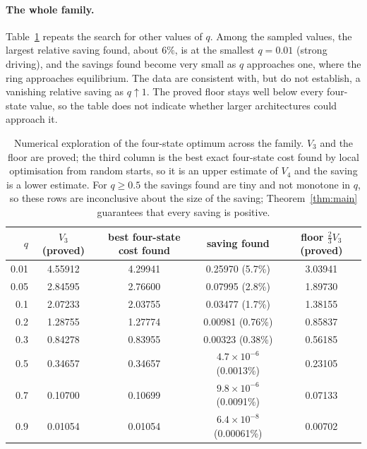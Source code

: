 \documentclass[11pt,a4paper]{article}
\theoremstyle{remark}\newtheorem{remark}[theorem]{Remark}
\begin{document}
\paragraph{The whole family.}
Table~\ref{tab:grid} repeats the search for other values of $q$.
Among the sampled values, the largest relative saving found, about $6\%$, is
at the smallest $q=0.01$ (strong driving), and the savings found become very
small as $q$ approaches one, where the ring approaches equilibrium. The data
are consistent with, but do not establish, a vanishing relative saving as
$q\uparrow1$. The proved floor stays well below every four-state value, so the
table does not indicate whether larger architectures could approach it.
\begin{table}[tb]\centering\small
\caption{Numerical exploration of the four-state optimum across the family. $V_3$ and the floor are proved; the third column is the best exact four-state cost found by local optimisation from random starts, so it is an upper estimate of $V_4$ and the saving is a lower estimate. For $q\geq0.5$ the savings found are tiny and not monotone in $q$, so these rows are inconclusive about the size of the saving; Theorem~\ref{thm:main} guarantees that every saving is positive.}
\label{tab:grid}
\begin{tabular}{@{}rcccc@{}}\toprule
$q$ & $V_3$ (proved) & best four-state cost found & saving found & floor $\tfrac23V_3$ (proved)\\\midrule
0.01 & 4.55912 & 4.29941 & 0.25970 (5.7\%) & 3.03941\\
0.05 & 2.84595 & 2.76600 & 0.07995 (2.8\%) & 1.89730\\
0.1 & 2.07233 & 2.03755 & 0.03477 (1.7\%) & 1.38155\\
0.2 & 1.28755 & 1.27774 & 0.00981 (0.76\%) & 0.85837\\
0.3 & 0.84278 & 0.83955 & 0.00323 (0.38\%) & 0.56185\\
0.5 & 0.34657 & 0.34657 & $4.7\times10^{-6}$ (0.0013\%) & 0.23105\\
0.7 & 0.10700 & 0.10699 & $9.8\times10^{-6}$ (0.0091\%) & 0.07133\\
0.9 & 0.01054 & 0.01054 & $6.4\times10^{-8}$ (0.00061\%) & 0.00702\\
\bottomrule\end{tabular}\end{table}
\end{document}
